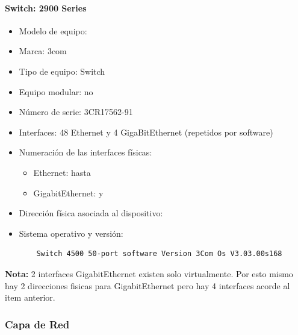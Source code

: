 \paragraph{Switch: 2900 Series}
\begin{itemize}
  \item Modelo de equipo: 
  \item Marca: 3com
  \item Tipo de equipo: Switch
  \item Equipo modular: no
  \item Número de serie: 3CR17562-91
  \item Interfaces: 48 Ethernet y 4 GigaBitEthernet 
    (repetidos por software)
  \item Numeración de las interfaces físicas:
    \begin{itemize}
      \item Ethernet:  hasta 
      \item GigabitEthernet:  y 
    \end{itemize}
  \item Dirección física asociada al dispositivo: 
  \item Sistema operativo y versión: 
    \begin{verbatim}
    Switch 4500 50-port software Version 3Com Os V3.03.00s168
    \end{verbatim}
\end{itemize}
\textbf{Nota:} 2 interfaces GigabitEthernet existen solo virtualmente. Por esto
mismo hay 2 direcciones fisicas para GigabitEthernet pero hay 4 interfaces
acorde al item anterior.

\subsubsection*{Capa de Red}

